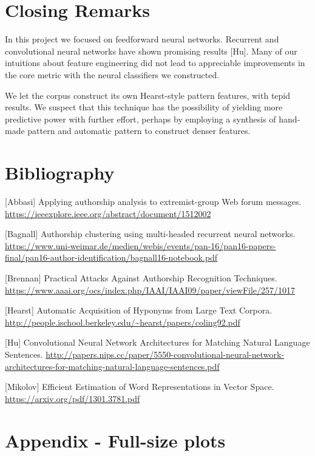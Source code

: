 \documentclass[8pt]{article}
\begin{document}
\section{Closing Remarks}
In this project we focused on feedforward neural networks. Recurrent and convolutional neural networks have shown promising results [Hu]. Many of our intuitions about feature engineering did not lead to appreciable improvements in the core metric with the neural classifiers we constructed.

We let the corpus construct its own Hearst-style pattern features, with tepid results. We suspect that this technique has the possibility of yielding more predictive power with further effort, perhaps by employing a synthesis of hand-made pattern and automatic pattern to construct denser features.



\section{Bibliography}


[Abbasi] Applying authorship analysis to extremist-group Web forum messages. \url{https://ieeexplore.ieee.org/abstract/document/1512002} 

[Bagnall] Authorship clustering using multi-headed recurrent
neural networks. \url{https://www.uni-weimar.de/medien/webis/events/pan-16/pan16-papers-final/pan16-author-identification/bagnall16-notebook.pdf}

[Brennan] Practical Attacks Against Authorship Recognition Techniques. \url{https://www.aaai.org/ocs/index.php/IAAI/IAAI09/paper/viewFile/257/1017}

[Hearst] Automatic Acquisition of Hyponyms
from Large Text Corpora. \url{http://people.ischool.berkeley.edu/~hearst/papers/coling92.pdf}

[Hu] Convolutional Neural Network Architectures for
Matching Natural Language Sentences. \url{http://papers.nips.cc/paper/5550-convolutional-neural-network-architectures-for-matching-natural-language-sentences.pdf}

[Mikolov] Efficient Estimation of Word Representations in
Vector Space. \url{https://arxiv.org/pdf/1301.3781.pdf}

\vskip 5in


\section{Appendix - Full-size plots}
\end{document}

